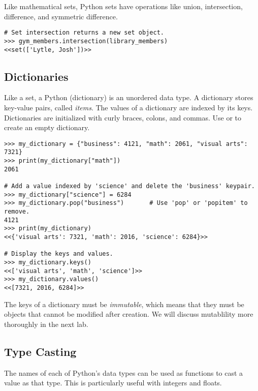 Like mathematical sets, Python sets have operations like union, intersection, 
difference, and symmetric difference.
\begin{lstlisting}
# Set intersection returns a new set object.
>>> gym_members.intersection(library_members)
<<set(['Lytle, Josh'])>>
\end{lstlisting}

\subsection*{Dictionaries} %

Like a set, a Python  (dictionary) is an unordered data type.
A dictionary stores key-value pairs, called \emph{items}.
The values of a dictionary are indexed by its keys.
Dictionaries are initialized with curly braces, colons, and commas.
Use  or \li{\{\}} to create an empty dictionary.

\begin{lstlisting}
>>> my_dictionary = {"business": 4121, "math": 2061, "visual arts": 7321} 
>>> print(my_dictionary["math"])
2061

# Add a value indexed by 'science' and delete the 'business' keypair.
>>> my_dictionary["science"] = 6284
>>> my_dictionary.pop("business")       # Use 'pop' or 'popitem' to remove.
4121
>>> print(my_dictionary)
<<{'visual arts': 7321, 'math': 2016, 'science': 6284}>>

# Display the keys and values.
>>> my_dictionary.keys()
<<['visual arts', 'math', 'science']>>
>>> my_dictionary.values()
<<[7321, 2016, 6284]>>
\end{lstlisting}

The keys of a dictionary must be \emph{immutable}, which means that they must be objects that cannot be modified after creation.
We will discuss mutablility more thoroughly in the next lab.

\subsection*{Type Casting} %

The names of each of Python's data types can be used as functions to cast a value as that type.
This is particularly useful with integers and floats.

